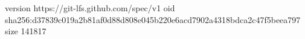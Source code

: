 version https://git-lfs.github.com/spec/v1
oid sha256:d37839c019a2b81af0d88d808e045b220e6acd7902a4318bdca2c47f5beea797
size 141817
